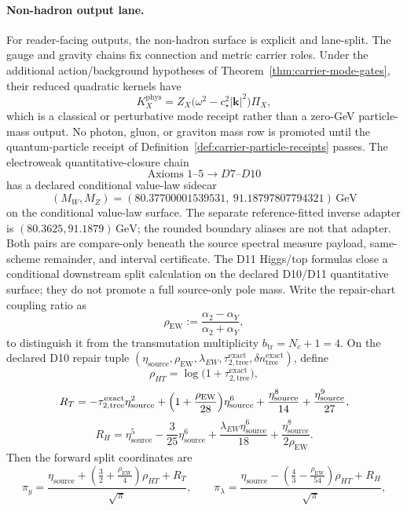 \documentclass[11pt]{article}
\begin{document}
\paragraph{Non-hadron output lane.}
For reader-facing outputs, the non-hadron surface is explicit and lane-split. The gauge and
gravity chains fix connection and metric carrier roles. Under the additional action/background
hypotheses of Theorem~\ref{thm:carrier-mode-gates}, their reduced quadratic kernels have
\[
K_X^{\mathrm{phys}}
=Z_X\bigl(\omega^2-c_\star^2|\mathbf k|^2\bigr)\Pi_X,
\]
which is a classical or perturbative mode receipt rather than a zero-GeV particle-mass output.
No photon, gluon, or graviton mass row is promoted until the quantum-particle receipt of
Definition~\ref{def:carrier-particle-receipts} passes. The electroweak quantitative-closure chain
\[
\text{Axioms }1\text{--}5 \longrightarrow D7\text{--}D10
\]
has a declared conditional value-law sidecar
\[
(M_W,M_Z)=
(80.37700001539531,\ 91.18797807794321)\,\mathrm{GeV}
\]
on the conditional value-law surface.  The separate reference-fitted inverse adapter is
\((80.3625,\allowbreak 91.1879)\,\mathrm{GeV}\); the rounded boundary aliases are not that
adapter.  Both pairs are compare-only beneath the source spectral measure payload,
same-scheme remainder, and interval certificate. The D11 Higgs/top formulas close a conditional downstream split calculation on the declared D10/D11 quantitative surface; they do not promote a full source-only pole mass.  Write the repair-chart coupling ratio as
\[
\rho_{\mathrm{EW}}:=\frac{\alpha_2-\alpha_Y}{\alpha_2+\alpha_Y},
\]
to distinguish it from the transmutation multiplicity
\(b_{\mathrm{tr}}=N_c+1=4\). On the declared D10 repair tuple \((\eta_{\mathrm{source}},\rho_{\mathrm{EW}},\lambda_{EW},\tau_{2,\mathrm{tree}}^{\mathrm{exact}},\delta n_{\mathrm{tree}}^{\mathrm{exact}})\), define
\[
\rho_{HT}=\log\!\bigl(1+\tau_{2,\mathrm{tree}}^{\mathrm{exact}}\bigr),
\]
\[
R_T=
-\tau_{2,\mathrm{tree}}^{\mathrm{exact}}\eta_{\mathrm{source}}^2
+\Bigl(1+\frac{\rho_{\mathrm{EW}}}{28}\Bigr)\eta_{\mathrm{source}}^6
+\frac{\eta_{\mathrm{source}}^8}{14}
+\frac{\eta_{\mathrm{source}}^9}{27},
\]
\[
R_H=
\eta_{\mathrm{source}}^5
-\frac{3}{25}\eta_{\mathrm{source}}^6
+\frac{\lambda_{EW}\eta_{\mathrm{source}}^6}{18}
+\frac{\eta_{\mathrm{source}}^8}{2\rho_{\mathrm{EW}}}.
\]
Then the forward split coordinates are
\[
\pi_y=
\frac{\eta_{\mathrm{source}}+\left(\frac32+\frac{\rho_{\mathrm{EW}}}4\right)\rho_{HT}+R_T}{\sqrt{\pi}},
\qquad
\pi_\lambda=
\frac{\eta_{\mathrm{source}}-\left(\frac43-\frac{\rho_{\mathrm{EW}}}{54}\right)\rho_{HT}+R_H}{\sqrt{\pi}},
\]
\end{document}
